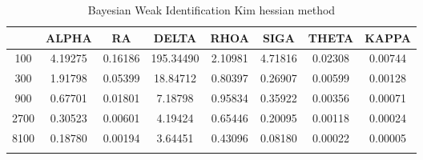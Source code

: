 \documentclass[a4paper,10pt]{article}
\begin{document}
\centering
\begin{longtable}{cccccccc}
\toprule
 & ALPHA & RA & DELTA & RHOA & SIGA & THETA & KAPPA \\
\midrule
100 & 4.19275 & 0.16186 & 195.34490 & 2.10981 & 4.71816 & 0.02308 & 0.00744 \\
300 & 1.91798 & 0.05399 & 18.84712 & 0.80397 & 0.26907 & 0.00599 & 0.00128 \\
900 & 0.67701 & 0.01801 & 7.18798 & 0.95834 & 0.35922 & 0.00356 & 0.00071 \\
2700 & 0.30523 & 0.00601 & 4.19424 & 0.65446 & 0.20095 & 0.00118 & 0.00024 \\
8100 & 0.18780 & 0.00194 & 3.64451 & 0.43096 & 0.08180 & 0.00022 & 0.00005 \\
\bottomrule
\caption{Bayesian Weak Identification Kim hessian method}
\label{table:tbl:WeakKim_hessian}
\end{longtable}
\end{document}
